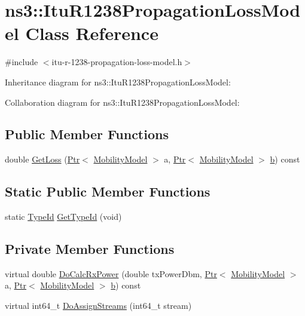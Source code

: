 \hypertarget{classns3_1_1ItuR1238PropagationLossModel}{}\section{ns3\+:\+:Itu\+R1238\+Propagation\+Loss\+Model Class Reference}
\label{classns3_1_1ItuR1238PropagationLossModel}


{\ttfamily \#include $<$itu-\/r-\/1238-\/propagation-\/loss-\/model.\+h$>$}



Inheritance diagram for ns3\+:\+:Itu\+R1238\+Propagation\+Loss\+Model\+:


Collaboration diagram for ns3\+:\+:Itu\+R1238\+Propagation\+Loss\+Model\+:
\subsection*{Public Member Functions}
\begin{DoxyCompactItemize}
\item 
double \hyperlink{classns3_1_1ItuR1238PropagationLossModel_a9f628a8cf40ba661eb60ba2fb81406c2}{Get\+Loss} (\hyperlink{classns3_1_1Ptr}{Ptr}$<$ \hyperlink{classns3_1_1MobilityModel}{Mobility\+Model} $>$ a, \hyperlink{classns3_1_1Ptr}{Ptr}$<$ \hyperlink{classns3_1_1MobilityModel}{Mobility\+Model} $>$ \hyperlink{lte__pathloss_8m_a21ad0bd836b90d08f4cf640b4c298e7c}{b}) const 
\end{DoxyCompactItemize}
\subsection*{Static Public Member Functions}
\begin{DoxyCompactItemize}
\item 
static \hyperlink{classns3_1_1TypeId}{Type\+Id} \hyperlink{classns3_1_1ItuR1238PropagationLossModel_a669516317b90f03ed14e9428584d64cf}{Get\+Type\+Id} (void)
\end{DoxyCompactItemize}
\subsection*{Private Member Functions}
\begin{DoxyCompactItemize}
\item 
virtual double \hyperlink{classns3_1_1ItuR1238PropagationLossModel_a5264af642cb5a328f467a7c445dee693}{Do\+Calc\+Rx\+Power} (double tx\+Power\+Dbm, \hyperlink{classns3_1_1Ptr}{Ptr}$<$ \hyperlink{classns3_1_1MobilityModel}{Mobility\+Model} $>$ a, \hyperlink{classns3_1_1Ptr}{Ptr}$<$ \hyperlink{classns3_1_1MobilityModel}{Mobility\+Model} $>$ \hyperlink{lte__pathloss_8m_a21ad0bd836b90d08f4cf640b4c298e7c}{b}) const 
\item 
virtual int64\+\_\+t \hyperlink{classns3_1_1ItuR1238PropagationLossModel_a5870cf6f801d01593b161cceaee65427}{Do\+Assign\+Streams} (int64\+\_\+t stream)
\end{DoxyCompactItemize}
